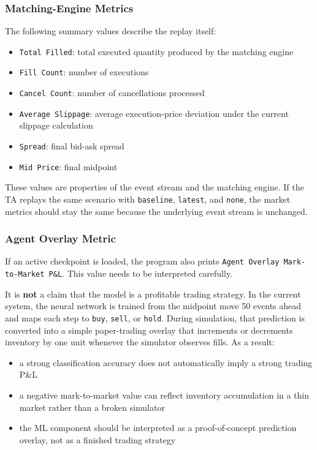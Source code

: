 \documentclass[11pt]{article}
\begin{document}
\subsubsection*{Matching-Engine Metrics}
The following summary values describe the replay itself:
\begin{itemize}
    \item \texttt{Total Filled}: total executed quantity produced by the
    matching engine
    \item \texttt{Fill Count}: number of executions
    \item \texttt{Cancel Count}: number of cancellations processed
    \item \texttt{Average Slippage}: average execution-price deviation under the
    current slippage calculation
    \item \texttt{Spread}: final bid-ask spread
    \item \texttt{Mid Price}: final midpoint
\end{itemize}

These values are properties of the event stream and the matching engine. If the
TA replays the same scenario with \texttt{baseline}, \texttt{latest}, and
\texttt{none}, the market metrics should stay the same because the underlying
event stream is unchanged.

\subsubsection*{Agent Overlay Metric}
If an active checkpoint is loaded, the program also prints
\texttt{Agent Overlay Mark-to-Market P\&L}. This value needs to be interpreted
carefully.

It is \textbf{not} a claim that the model is a profitable trading strategy. In
the current system, the neural network is trained from the midpoint move
50 events ahead and maps each step to \texttt{buy}, \texttt{sell}, or
\texttt{hold}. During
simulation, that prediction is converted into a simple paper-trading overlay
that increments or decrements inventory by one unit whenever the simulator
observes fills. As a result:
\begin{itemize}
    \item a strong classification accuracy does not automatically imply a strong
    trading P\&L
    \item a negative mark-to-market value can reflect inventory accumulation in
    a thin market rather than a broken simulator
    \item the ML component should be interpreted as a proof-of-concept
    prediction overlay, not as a finished trading strategy
\end{itemize}
\end{document}
